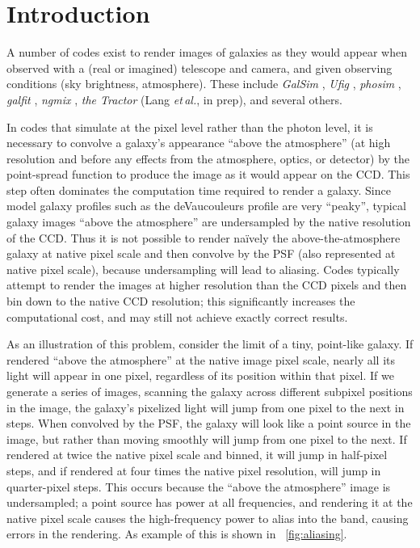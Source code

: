 \documentclass[11pt,letterpaper]{aastex63}
\newcommand{\foreign}[1]{\emph{#1}}
\newcommand{\etal}{\foreign{et\,al.}}
\newcommand{\figref}[1]{\figurename~\ref{#1}}
\newcommand{\project}[1]{\textsl{#1}}
\begin{document}
\section{Introduction}

A number of codes exist to render images of galaxies as they would
appear when observed with a (real or imagined) telescope and camera,
and given observing conditions (sky brightness, atmosphere).  These
include \project{GalSim} \citep{galsim}, \project{Ufig} \citep{ufig},
\project{phosim} \citep{phosim}, \project{galfit} \citep{galfit}, 
\project{ngmix} \citep{ngmix},
\project{the Tractor} (Lang \etal, in prep), and several others.


In codes that simulate at the pixel level rather than the photon
level, it is necessary to convolve a galaxy's appearance ``above the
atmosphere'' (at high resolution and before any effects from the
atmosphere, optics, or detector) by the point-spread function to
produce the image as it would appear on the CCD.  This step often
dominates the computation time required to render a galaxy.  Since
model galaxy profiles such as the deVaucouleurs profile are very
``peaky'', typical galaxy images ``above the atmosphere'' are
undersampled by the native resolution of the CCD.  Thus it is not
possible to render na\"ively the above-the-atmosphere galaxy at native
pixel scale and then convolve by the PSF (also represented at native
pixel scale), because undersampling will lead to aliasing.
Codes typically attempt to render the images at higher resolution than the
CCD pixels and then bin down to the native CCD resolution; this
significantly increases the computational cost, and may still not
achieve exactly correct results.



As an illustration of this problem, consider the limit of a tiny,
point-like galaxy.  If rendered ``above the atmosphere'' at the native
image pixel scale, nearly all its light will appear in one pixel,
regardless of its position within that pixel.  If we generate a series
of images, scanning the galaxy across different subpixel positions in
the image, the galaxy's pixelized light will jump from one pixel to
the next in steps.  When convolved by the PSF, the galaxy will look
like a point source in the image, but rather than moving smoothly will
jump from one pixel to the next.  If rendered at twice the native pixel
scale and binned, it will jump in half-pixel steps, and if rendered at
four times the native pixel resolution, will jump in quarter-pixel
steps.  This occurs because the ``above the atmosphere'' image is
undersampled; a point source has power at all frequencies, and
rendering it at the native pixel scale causes the high-frequency power
to alias into the band, causing errors in the rendering.  As example of this
is shown in \figref{fig:aliasing}.
\end{document}
